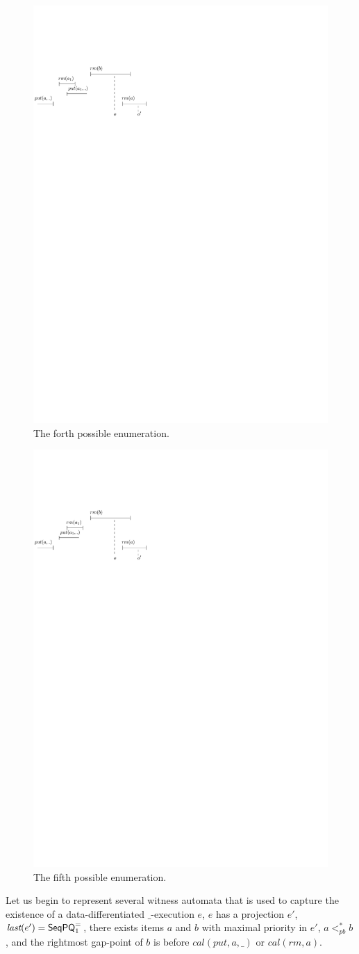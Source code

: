 \begin{figure}[htbp]
  \centering
  \includegraphics[width=0.4 \textwidth]{figures/PIC-HIS-PQ1Equal-4.pdf}
  \caption{The forth possible enumeration.}
  \label{fig:history enumeration 4 for PQ1Equal}
\end{figure}

\begin{figure}[htbp]
  \centering
  \includegraphics[width=0.4 \textwidth]{figures/PIC-HIS-PQ1Equal-5.pdf}
  \caption{The fifth possible enumeration.}
  \label{fig:history enumeration 5 for PQ1Equal}
\end{figure}


Let us begin to represent several witness automata that is used to capture the existence of a data-differentiated $\_$-execution $e$, $e$ has a projection $e'$, $\textit{last}(e') = \mathsf{SeqPQ}_1^{=}$, there exists items $a$ and $b$ with maximal priority in $e'$, $a <_{\textit{pb}}^* b$, and the rightmost gap-point of $b$ is before $\textit{cal}(\textit{put},a,\_)$ or $\textit{cal}(\textit{rm},a)$.

